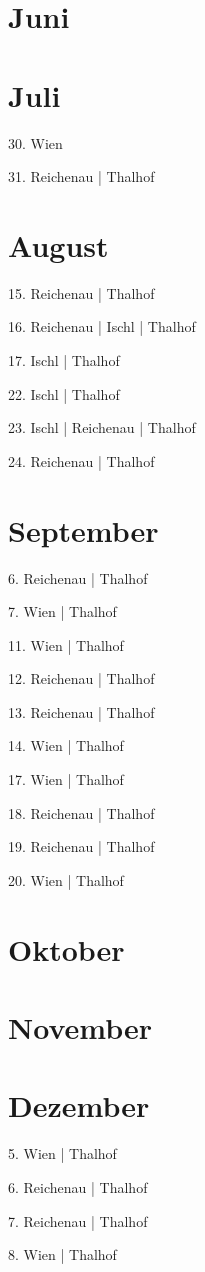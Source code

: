 \documentclass[twoside=false,titlepage=false,open=any, parskip=never, fontsize=10pt, headings=small, chapterprefix=false, appendixprefix=false, DIV=15]{scrbook}
\begin{document}
\begin{multicols}{3}
            \section*{Juni}
            \section*{Juli}
            30. Wien\par
            31. Reichenau | Thalhof\par
            \section*{August}
            15. Reichenau | Thalhof\par
            16. Reichenau | Ischl | Thalhof\par
            17. Ischl | Thalhof\par
            22. Ischl | Thalhof\par
            23. Ischl | Reichenau | Thalhof\par
            24. Reichenau | Thalhof\par
            \section*{September}
            6. Reichenau | Thalhof\par
            7. Wien | Thalhof\par
            11. Wien | Thalhof\par
            12. Reichenau | Thalhof\par
            13. Reichenau | Thalhof\par
            14. Wien | Thalhof\par
            17. Wien | Thalhof\par
            18. Reichenau | Thalhof\par
            19. Reichenau | Thalhof\par
            20. Wien | Thalhof\par
            \section*{Oktober}
            \section*{November}
            \section*{Dezember}
            5. Wien | Thalhof\par
            6. Reichenau | Thalhof\par
            7. Reichenau | Thalhof\par
            8. Wien | Thalhof\par

\end{multicols}
\end{document}
